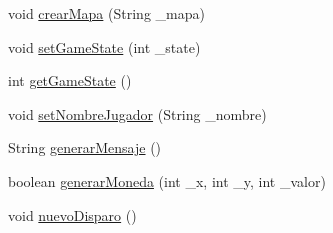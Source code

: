 \begin{DoxyCompactItemize}
\item 
void \hyperlink{classBatallaEspacial_1_1Juego_afe4506f4253195f0e42dca36a9a16169}{crearMapa} (String \_\-mapa)
\item 
void \hyperlink{classBatallaEspacial_1_1Juego_abd8b8ad38e8965be83e9fdceda042cf3}{setGameState} (int \_\-state)
\item 
int \hyperlink{classBatallaEspacial_1_1Juego_a0088967edd1b4da56e451f4066c90d8a}{getGameState} ()
\item 
void \hyperlink{classBatallaEspacial_1_1Juego_aa68df7b9fcdf77f36e22fa649d2e504d}{setNombreJugador} (String \_\-nombre)
\item 
String \hyperlink{classBatallaEspacial_1_1Juego_a3117a54416ecf1eb6a58095bf208b656}{generarMensaje} ()
\item 
boolean \hyperlink{classBatallaEspacial_1_1Juego_a70936babcb7c1bfa89588a8fbe67753c}{generarMoneda} (int \_\-x, int \_\-y, int \_\-valor)
\item 
void \hyperlink{classBatallaEspacial_1_1Juego_ab76f9af23024a4f491d0dc5ec602e8a8}{nuevoDisparo} ()
\end{DoxyCompactItemize}
